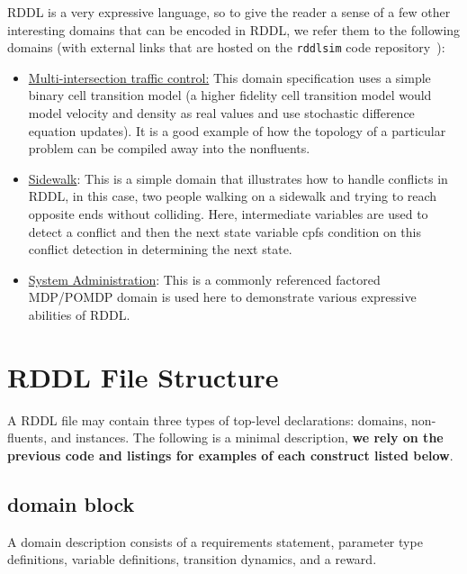 \documentclass[11pt,a4paper]{article}
\begin{document}
\label{sec:other_domains}

RDDL is a very expressive language, so to give the reader a
sense of a few other interesting domains that can be encoded in
RDDL, we refer them to the following domains (with external links that
are hosted on the \texttt{rddlsim} code repository~\cite{rddlsim}):
\begin{itemize}
\item
\href{http://code.google.com/p/rddlsim/source/browse/trunk/files/rddl/test/traffic_binary_ctm.rddl}{Multi-intersection
traffic control:} This domain specification uses a simple binary cell
transition model (a higher fidelity cell transition model would model velocity and density as real values and use stochastic difference equation updates).  It is a good example of how the topology of a
particular problem can be compiled away into the nonfluents.
\item \href{http://code.google.com/p/rddlsim/source/browse/trunk/files/rddl/test/sidewalk.rddl}{Sidewalk}: This is a simple domain that illustrates how to handle conflicts in RDDL, in this case, two people walking on a sidewalk and trying to reach opposite ends without colliding.  Here, intermediate variables are used to detect a conflict and then the next state variable cpfs condition on this conflict detection in determining the next state.
\item \href{http://code.google.com/p/rddlsim/source/browse/trunk/files/rddl/test/sysadmin.rddl}{System Administration}: This is a commonly referenced factored MDP/POMDP domain is used here to demonstrate various expressive abilities of RDDL.
\end{itemize}

\section{RDDL File Structure}

A RDDL file may contain three types of top-level declarations:
domains, non-fluents, and instances.  The following is a minimal
description, {\bf we rely on the previous code and listings for
examples of each construct listed below}.

\subsection{domain block}

A domain description consists of a requirements statement,
parameter type definitions, variable definitions, transition dynamics,
and a reward.
\end{document}
